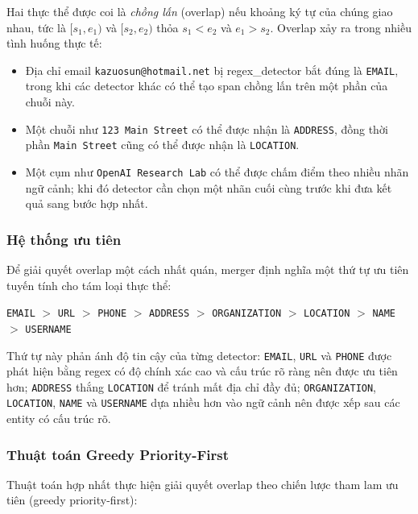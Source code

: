 Hai thực thể được coi là \textit{chồng lấn} (overlap) nếu khoảng ký tự của
chúng giao nhau, tức là $[s_1, e_1)$ và $[s_2, e_2)$ thỏa $s_1 < e_2$ và
$e_1 > s_2$. Overlap xảy ra trong nhiều tình huống thực tế:

\begin{itemize}[nosep]
    \item Địa chỉ email \texttt{kazuosun@hotmail.net} bị regex\_detector bắt
          đúng là \texttt{EMAIL}, trong khi các detector khác có thể tạo span
          chồng lấn trên một phần của chuỗi này.
    \item Một chuỗi như \texttt{123 Main Street} có thể được nhận là
          \texttt{ADDRESS}, đồng thời phần \texttt{Main Street} cũng có thể
          được nhận là \texttt{LOCATION}.
    \item Một cụm như \texttt{OpenAI Research Lab} có thể được chấm điểm theo
          nhiều nhãn ngữ cảnh; khi đó detector cần chọn một nhãn cuối cùng
          trước khi đưa kết quả sang bước hợp nhất.
\end{itemize}

\subsubsection{Hệ thống ưu tiên}

Để giải quyết overlap một cách nhất quán, merger định nghĩa một thứ tự ưu tiên
tuyến tính cho tám loại thực thể:

\begin{center}
    \texttt{EMAIL} $>$ \texttt{URL} $>$ \texttt{PHONE} $>$
    \texttt{ADDRESS} $>$ \texttt{ORGANIZATION} $>$ \texttt{LOCATION} $>$
    \texttt{NAME} $>$ \texttt{USERNAME}
\end{center}

Thứ tự này phản ánh độ tin cậy của từng detector: \texttt{EMAIL}, \texttt{URL}
và \texttt{PHONE} được phát hiện bằng regex có độ chính xác cao và cấu trúc
rõ ràng nên được ưu tiên hơn; \texttt{ADDRESS} thắng \texttt{LOCATION} để tránh
mất địa chỉ đầy đủ; \texttt{ORGANIZATION}, \texttt{LOCATION}, \texttt{NAME} và
\texttt{USERNAME} dựa nhiều hơn vào ngữ cảnh nên được xếp sau các entity có cấu
trúc rõ.

\subsubsection{Thuật toán Greedy Priority-First}

Thuật toán hợp nhất thực hiện giải quyết overlap theo chiến lược tham lam ưu
tiên (greedy priority-first):

